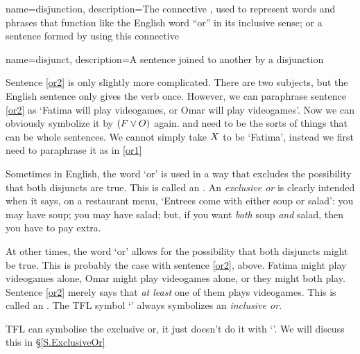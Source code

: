 {
name=disjunction,
description={The connective \eor, used to represent words and phrases that function like the English word ``or'' in its inclusive sense; or a sentence formed by using this connective}
}

{
name=disjunct,
description={A sentence joined to another by a \gls{disjunction}}
}

Sentence \ref{or2} is only slightly more complicated. There are two subjects, but the English sentence only gives the verb once. However, we can paraphrase sentence \ref{or2} as `Fatima will play videogames, or Omar will play videogames'. Now we can obviously symbolize it by $(F \vee O)$ again.
\metaX and \metaY need to be the sorts of things that can be whole sentences. We cannot simply take $X$ to be `Fatima', instead we first need to paraphrase it as in \ref{or1}

Sometimes in English, the word `or' is used in a way that excludes the possibility that both disjuncts are true. This is called an .  An \emph{exclusive or} is clearly intended when it says, on a restaurant menu, `Entrees come with either soup or salad': you may have soup; you may have salad; but, if you want \emph{both} soup \emph{and} salad, then you have to pay extra.

At other times, the word `or' allows for the possibility that both disjuncts might be true. This is probably the case with sentence \ref{or2}, above. Fatima might play videogames alone, Omar might play videogames alone, or they might both play. Sentence \ref{or2} merely says that \emph{at least} one of them plays videogames. This is called an . The TFL symbol `\eor' always symbolizes an \emph{inclusive or}.

TFL can symbolise the exclusive or, it just doesn't do it with `\eor'. We will discuss this in \S\ref{S.ExclusiveOr}

